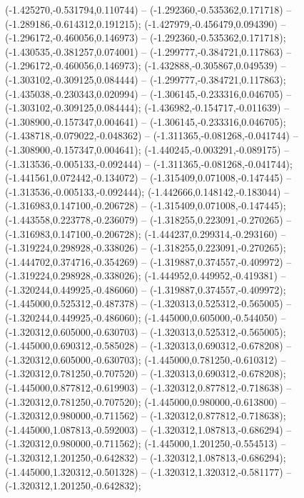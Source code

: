  (-1.425270,-0.531794,0.110744) -- (-1.292360,-0.535362,0.171718) -- (-1.289186,-0.614312,0.191215);
 (-1.427979,-0.456479,0.094390) -- (-1.296172,-0.460056,0.146973) -- (-1.292360,-0.535362,0.171718);
 (-1.430535,-0.381257,0.074001) -- (-1.299777,-0.384721,0.117863) -- (-1.296172,-0.460056,0.146973);
 (-1.432888,-0.305867,0.049539) -- (-1.303102,-0.309125,0.084444) -- (-1.299777,-0.384721,0.117863);
 (-1.435038,-0.230343,0.020994) -- (-1.306145,-0.233316,0.046705) -- (-1.303102,-0.309125,0.084444);
 (-1.436982,-0.154717,-0.011639) -- (-1.308900,-0.157347,0.004641) -- (-1.306145,-0.233316,0.046705);
 (-1.438718,-0.079022,-0.048362) -- (-1.311365,-0.081268,-0.041744) -- (-1.308900,-0.157347,0.004641);
 (-1.440245,-0.003291,-0.089175) -- (-1.313536,-0.005133,-0.092444) -- (-1.311365,-0.081268,-0.041744);
 (-1.441561,0.072442,-0.134072) -- (-1.315409,0.071008,-0.147445) -- (-1.313536,-0.005133,-0.092444);
 (-1.442666,0.148142,-0.183044) -- (-1.316983,0.147100,-0.206728) -- (-1.315409,0.071008,-0.147445);
 (-1.443558,0.223778,-0.236079) -- (-1.318255,0.223091,-0.270265) -- (-1.316983,0.147100,-0.206728);
 (-1.444237,0.299314,-0.293160) -- (-1.319224,0.298928,-0.338026) -- (-1.318255,0.223091,-0.270265);
 (-1.444702,0.374716,-0.354269) -- (-1.319887,0.374557,-0.409972) -- (-1.319224,0.298928,-0.338026);
 (-1.444952,0.449952,-0.419381) -- (-1.320244,0.449925,-0.486060) -- (-1.319887,0.374557,-0.409972);
 (-1.445000,0.525312,-0.487378) -- (-1.320313,0.525312,-0.565005) -- (-1.320244,0.449925,-0.486060);
 (-1.445000,0.605000,-0.544050) -- (-1.320312,0.605000,-0.630703) -- (-1.320313,0.525312,-0.565005);
 (-1.445000,0.690312,-0.585028) -- (-1.320313,0.690312,-0.678208) -- (-1.320312,0.605000,-0.630703);
 (-1.445000,0.781250,-0.610312) -- (-1.320312,0.781250,-0.707520) -- (-1.320313,0.690312,-0.678208);
 (-1.445000,0.877812,-0.619903) -- (-1.320312,0.877812,-0.718638) -- (-1.320312,0.781250,-0.707520);
 (-1.445000,0.980000,-0.613800) -- (-1.320312,0.980000,-0.711562) -- (-1.320312,0.877812,-0.718638);
 (-1.445000,1.087813,-0.592003) -- (-1.320312,1.087813,-0.686294) -- (-1.320312,0.980000,-0.711562);
 (-1.445000,1.201250,-0.554513) -- (-1.320312,1.201250,-0.642832) -- (-1.320312,1.087813,-0.686294);
 (-1.445000,1.320312,-0.501328) -- (-1.320312,1.320312,-0.581177) -- (-1.320312,1.201250,-0.642832);
